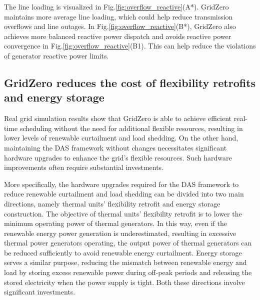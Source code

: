 The line loading is visualized in Fig.\ref{fig:overflow_reactive}(A*). GridZero maintains more average line loading, which could help reduce transmission overflows and line outages. In Fig.\ref{fig:overflow_reactive}(B*), GridZero also achieves more balanced reactive power dispatch and avoids reactive power convergence in Fig.\ref{fig:overflow_reactive}(B1). This can help reduce the violations of generator reactive power limits.



\subsection*{GridZero reduces the cost of flexibility retrofits and energy storage}
Real grid simulation results show that GridZero is able to achieve efficient real-time scheduling without the need for additional flexible resources, resulting in lower levels of renewable curtailment and load shedding. On the other hand, maintaining the DAS framework without changes necessitates significant hardware upgrades to enhance the grid's flexible resources. Such hardware improvements often require substantial investments.
 
More specifically, the hardware upgrades required for the DAS framework to reduce renewable curtailment and load shedding can be divided into two main directions, namely thermal units' flexibility retrofit and energy storage construction.
The objective of thermal units' flexibility retrofit is to lower the minimum operating power of thermal generators. 
In this way, even if the renewable energy power generation is underestimated, resulting in excessive thermal power generators operating, the output power of thermal generators can be reduced sufficiently to avoid renewable energy curtailment.
Energy storage serves a similar purpose, reducing the mismatch between renewable energy and load by storing excess renewable power during off-peak periods and releasing the stored electricity when the power supply is tight.
Both these directions involve significant investments. 


